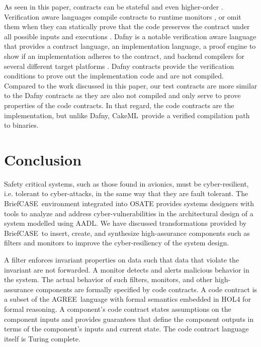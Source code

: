 \documentclass[global,twocolumn]{svjour}
\newcommand{\brfcs}{BriefCASE}
\newcommand{\agr}{AGREE}
\newcommand{\ckml}{CakeML}
\begin{document}
As seen in this paper, contracts can be stateful and even higher-order \cite{10.1145/583852.581484}.
%
Verification aware languages compile contracts to runtime monitors \cite{10.1007/978-3-642-28869-2_11}, or omit them when they can statically prove that the code preserves the contract under all possible inputs and executions \cite{10.1145/3158139}.
%
Dafny is a notable verification aware language that provides a contract language, an implementation language, a proof engine to show if an implementation adheres to the contract, and backend compilers for several different target platforms \cite{dafny}.
%
Dafny contracts provide the verification conditions to prove out the implementation code and are not compiled.
%
Compared to the work discussed in this paper, our test contracts are more similar to the Dafny contracts as they are also not compiled and only serve to prove properties of the code contracts.
%
In that regard, the code contracts are the implementation, but unlike Dafny, \ckml\ provide a verified compilation path to binaries.


\section{Conclusion}
\label{sec:conclusion}

Safety critical systems, such as those found in avionics, must be cyber-resilient, i.e. tolerant to cyber-attacks, in the same way that they are fault tolerant.
%
The \brfcs\ environment integrated into OSATE provides systems designers with tools to analyze and address cyber-vulnerabilities in the architectural design of a system modelled using AADL.
%
We have discussed transformations provided by \brfcs\ to insert, create, and synthesize high-assurance components such as filters and monitors to improve the cyber-resiliency of the system design.

A filter enforces invariant properties on data such that data that violate the invariant are not forwarded.
%
A monitor detects and alerts malicious behavior in the system.
%
The actual behavior of such filters, monitors, and other high-assurance components are formally specified by code contracts.
%
A code contract is a subset of the \agr\ language with formal semantics embedded in HOL4 for formal reasoning.
%
A component's code contract states assumptions on the component inputs and provides guarantees that define the component outputs in terms of the component's inputs and current state.
%
The code contract language itself is Turing complete.
\end{document}
